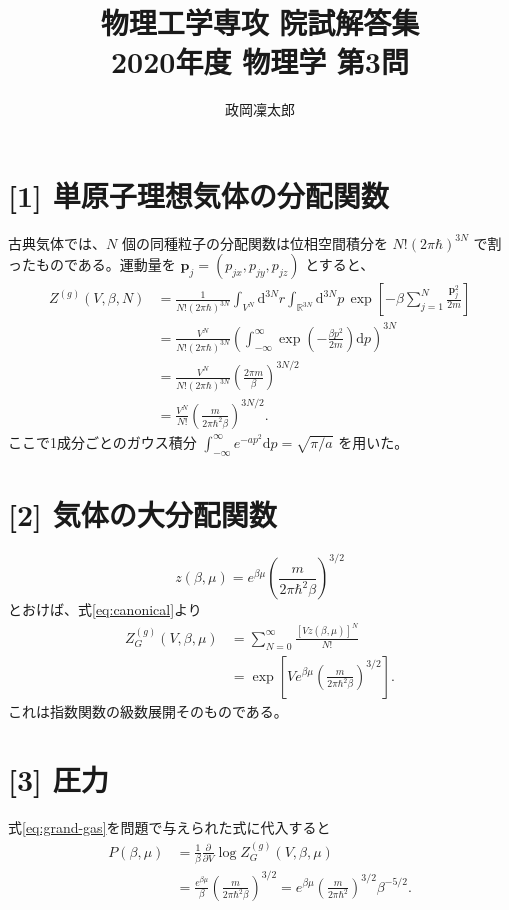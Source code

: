 \documentclass[11pt,a4paper]{article}
\title{物理工学専攻 院試解答集\\2020年度 物理学 第3問}
\author{政岡凜太郎}
\date{}
\begin{document}
\maketitle

\section*{[1] 単原子理想気体の分配関数}
古典気体では、$N$ 個の同種粒子の分配関数は位相空間積分を
$N!(2\pi\hbar)^{3N}$ で割ったものである。運動量を
$\boldsymbol{p}_j=(p_{jx},p_{jy},p_{jz})$ とすると、
\begin{align}
 Z^{(g)}(V,\beta,N)
 &=\frac{1}{N!(2\pi\hbar)^{3N}}
   \int_{V^N}\mathrm{d}^{3N}r\int_{\mathbb{R}^{3N}}\mathrm{d}^{3N}p\,
   \exp\!\left[-\beta\sum_{j=1}^{N}\frac{\boldsymbol{p}_j^2}{2m}\right]\\
 &=\frac{V^N}{N!(2\pi\hbar)^{3N}}
   \left(\int_{-\infty}^{\infty}
        \exp\!\left(-\frac{\beta p^2}{2m}\right)\mathrm{d}p\right)^{3N}\\
 &=\frac{V^N}{N!(2\pi\hbar)^{3N}}
   \left(\frac{2\pi m}{\beta}\right)^{3N/2}\\
 &=\frac{V^N}{N!}
   \left(\frac{m}{2\pi\hbar^2\beta}\right)^{3N/2}.
 \label{eq:canonical}
\end{align}
ここで1成分ごとのガウス積分
$\int_{-\infty}^{\infty}e^{-ap^2}\mathrm{d}p=\sqrt{\pi/a}$
を用いた。

\section*{[2] 気体の大分配関数}
\begin{equation}
 z(\beta,\mu)=e^{\beta\mu}
     \left(\frac{m}{2\pi\hbar^2\beta}\right)^{3/2}
\end{equation}
とおけば、式\eqref{eq:canonical}より
\begin{align}
 Z_G^{(g)}(V,\beta,\mu)
 &=\sum_{N=0}^{\infty}\frac{[Vz(\beta,\mu)]^N}{N!}\\
 &=\exp\!\left[V e^{\beta\mu}
        \left(\frac{m}{2\pi\hbar^2\beta}\right)^{3/2}\right].
 \label{eq:grand-gas}
\end{align}
これは指数関数の級数展開そのものである。

\section*{[3] 圧力}
式\eqref{eq:grand-gas}を問題で与えられた式に代入すると
\begin{align}
 P(\beta,\mu)
 &=\frac{1}{\beta}\frac{\partial}{\partial V}
       \log Z_G^{(g)}(V,\beta,\mu)\\
 &=\frac{e^{\beta\mu}}{\beta}
       \left(\frac{m}{2\pi\hbar^2\beta}\right)^{3/2}
 =e^{\beta\mu}\left(\frac{m}{2\pi\hbar^2}\right)^{3/2}\beta^{-5/2}.
 \label{eq:pressure}
\end{align}
\end{document}
